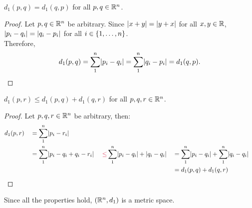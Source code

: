 \begin{answer}
  \begin{claim}
    $d_1(p, q) = d_1(q, p)$ for all $p, q \in \mathbb{R}^n$.

    \begin{proof}
      Let $p, q \in \mathbb{R}^n$ be arbitrary.
      Since $\lvert x + y\rvert = \lvert y + x\rvert$ for all $x, y \in \mathbb{R}$,
      $\lvert p_i - q_i\rvert = \lvert q_i - p_i\rvert$ for all $i \in \left\{1, \dots, n\right\}$. \\ Therefore,
      \[ d_1(p, q) = \sum_1^n \lvert p_i - q_i\rvert = \sum_1^n \lvert q_i - p_i\rvert = d_1(q, p). \]
    \end{proof}
  \end{claim}

  \newpage
  \begin{claim}
    $d_1(p, r) \leq d_1(p, q) + d_1(q, r)$ for all $p, q, r \in \mathbb{R}^n$.

    \begin{proof}
      Let $p, q, r \in \mathbb{R}^n$ be arbitrary, then:
      \begin{alignat*}{4}
        & d_1(p, r) &&= \sum_1^n \abs{p_i - r_i} \\
        &           &&= \sum_1^n \abs{p_i - q_i + q_i - r_i} \, && \,\crim{\leq} \sum_1^n \abs{p_i - q_i} + \abs{q_i - q_i} &&= \sum_1^n \abs{p_i - q_i} + \sum_1^n \abs{q_i - q_i} \\
        &           &&                                       &&                                                &&= d_1(p, q) + d_1(q, r)
      \end{alignat*}
    \end{proof}
  \end{claim}

  \step
  Since all the properties hold, $(\mathbb{R}^n, d_1)$ is a metric space.
\end{answer}

